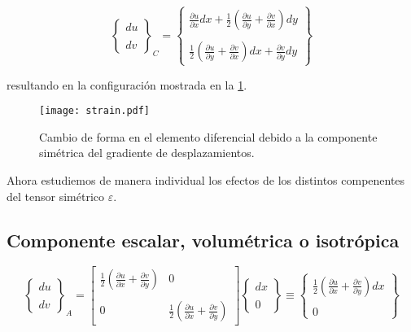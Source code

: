 \documentclass[../notas medios.tex]{subfiles}
\begin{document}
\[{\left\{ {\begin{array}{*{20}{c}}
{du}\\\\
{dv}
\end{array}} \right\}_C} = \left\{ {\begin{array}{*{20}{c}}
{\frac{{\partial u}}{{\partial x}}dx + \frac{1}{2}\left( {\frac{{\partial u}}{{\partial y}} + \frac{{\partial v}}{{\partial x}}} \right)dy}\\\\
{\frac{1}{2}\left( {\frac{{\partial u}}{{\partial y}} + \frac{{\partial v}}{{\partial x}}} \right)dx + \frac{{\partial v}}{{\partial y}}dy}
\end{array}} \right\}\]

resultando en la configuración mostrada en la \cref{strain}.


\begin{figure}[H]
\centering
	\texttt{[image: strain.pdf]}
	\caption{Cambio de forma en el elemento diferencial debido a la componente simétrica del gradiente de desplazamientos.}
	\label{strain}
\end{figure}

Ahora estudiemos de manera individual los efectos de los distintos compenentes del tensor simétrico $\varepsilon$.
\subsection{Componente escalar, volumétrica o isotrópica}

\[{\left\{ {\begin{array}{*{20}{c}}
{du}\\\\
{dv}
\end{array}} \right\}_A} = \left[ {\begin{array}{*{20}{c}}
{\frac{1}{2}\left( {\frac{{\partial u}}{{\partial x}} + \frac{{\partial v}}{{\partial y}}} \right)}&0\\\\
0&{\frac{1}{2}\left( {\frac{{\partial u}}{{\partial x}} + \frac{{\partial v}}{{\partial y}}} \right)}
\end{array}} \right]\left\{ {\begin{array}{*{20}{c}}
{dx}\\\\
0
\end{array}} \right\} \equiv \left\{ {\begin{array}{*{20}{c}}
{\frac{1}{2}\left( {\frac{{\partial u}}{{\partial x}} + \frac{{\partial v}}{{\partial y}}} \right)dx}\\\\
0
\end{array}} \right\}\]
\end{document}
